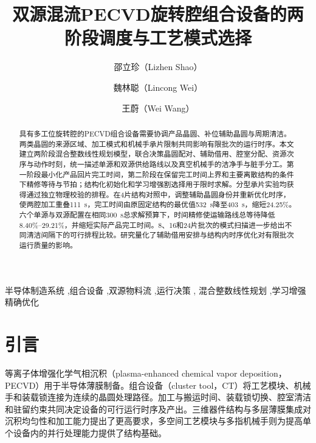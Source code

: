 \documentclass[final,5p,times,twocolumn]{elsarticle}
\begin{document}
\begin{frontmatter}

\title{双源混流PECVD旋转腔组合设备的两阶段调度与工艺模式选择}

\author[ustb]{邵立珍（Lizhen Shao）}
\author[ustb]{魏林聪（Lincong Wei）}
\author[ustb]{王蔚（Wei Wang）}

\address[ustb]{北京科技大学控制科学与工程系，北京市海淀区学院路30号，
北京100083，中国}

\begin{abstract}
具有多工位旋转腔的PECVD组合设备需要协调产品晶圆、补位辅助晶圆与周期清洁。两类晶圆的来源区域、加工模式和机械手承片限制共同影响有限批次的运行时序。本文建立两阶段混合整数线性规划模型，联合决策晶圆配对、辅助借用、腔室分配、资源次序与动作时刻，统一描述单源和双源供给路线以及真空机械手的洁净手与脏手分工。第一阶段最小化产品回片完工时间，第二阶段在保留完工时间上界和主要离散结构的条件下精修等待与节拍；结构化初始化和学习增强割选择用于限时求解。分型承片实验均获得通过独立物理校验的排程。在4片结构对照中，调整辅助晶圆身份并重新优化时序，使两腔加工重叠111~s，完工时间由原固定结构的最优值532~s降至403~s，缩短24.25\%。六个单源与双源配置在相同300~s总求解预算下，时间精修使运输路线总等待降低8.40\%--29.21\%，并缩短实际产品完工时间。8、16和24片批次的模式扫描进一步给出不同清洁间隔下的可行排程比较。研究量化了辅助借用安排与结构内时序优化对有限批次运行质量的影响。

\end{abstract}

\begin{keyword}
半导体制造系统 \sep 组合设备 \sep 双源物料流 \sep 运行决策 \sep
混合整数线性规划 \sep 学习增强精确优化
\end{keyword}

\end{frontmatter}
\section{引言}

等离子体增强化学气相沉积（plasma-enhanced chemical vapor deposition，PECVD）用于半导体薄膜制备。组合设备（cluster tool，CT）将工艺模块、机械手和装载锁连接为连续的晶圆处理路径。加工与搬运时间、装载锁切换、腔室清洁和驻留约束共同决定设备的可行运行时序及产出\citep{pan2018survey}。三维器件结构与多层薄膜集成对沉积均匀性和加工能力提出了更高要求\citep{appliedprecisioncvd}，多空间工艺模块与多指机械手则为提高单个设备内的并行处理能力提供了结构基础\citep{gu2024applied,gu2024multifinger}。
\end{document}

